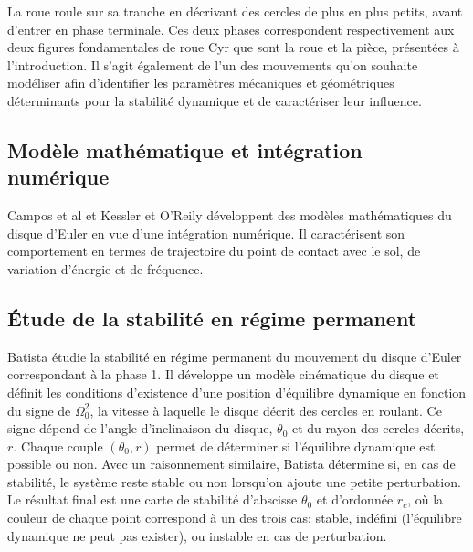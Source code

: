 La roue roule sur sa tranche en décrivant des cercles de plus en plus petits, avant d'entrer en phase terminale. Ces deux phases correspondent respectivement aux deux figures fondamentales de roue Cyr que sont la roue et la pièce, présentées à l'introduction. Il s'agit également de l'un des mouvements qu'on souhaite modéliser afin d'identifier les paramètres mécaniques et géométriques déterminants pour la stabilité dynamique et de caractériser leur influence. 

\subsection{Modèle mathématique et intégration numérique}
Campos et al \cite{campos} et Kessler et O'Reily \cite{ringing} développent des modèles mathématiques du disque d'Euler en vue d'une intégration numérique. Il caractérisent son comportement en termes de trajectoire du point de contact avec le sol, de variation d'énergie et de fréquence. 

\subsection{Étude de la stabilité en régime permanent}
Batista \cite{Batista} étudie la stabilité en régime permanent du mouvement du disque d'Euler correspondant à la phase 1. Il développe un modèle cinématique du disque et définit les conditions d'existence d'une position d'équilibre dynamique en fonction du signe de $\Omega_0^2$, la vitesse à laquelle le disque décrit des cercles en roulant. Ce signe dépend de l'angle d'inclinaison du disque, $\theta_0$ et du rayon des cercles décrits, $r$. Chaque couple $(\theta_0,r)$ permet de déterminer si l'équilibre dynamique est possible ou non. Avec un raisonnement similaire, Batista détermine si, en cas de stabilité, le système reste stable ou non lorsqu'on ajoute une petite perturbation. Le résultat final est une carte de stabilité d'abscisse $\theta_0$ et d'ordonnée $r_c$, où la couleur de chaque point correspond à un des trois cas: stable, indéfini (l'équilibre dynamique ne peut pas exister), ou instable en cas de perturbation.

